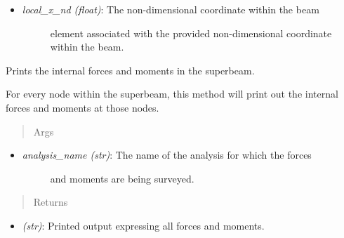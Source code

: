 \documentclass[letterpaper,10pt,english]{sphinxmanual}
\begin{document}
\begin{fulllineitems}
\begin{fulllineitems}
\begin{itemize}
\begin{description}
\end{description}

\item {} \begin{description}
\item[{\emph{local\_x\_nd (float)}: The non-dimensional coordinate within the beam}] \leavevmode
element associated with the provided non-dimensional coordinate
within the beam.

\end{description}

\end{itemize}

\end{fulllineitems}


\begin{fulllineitems}
\label{structures:AeroComBAT.Structures.SuperBeam.printInternalForce}
Prints the internal forces and moments in the superbeam.

For every node within the superbeam, this method will print out the
internal forces and moments at those nodes.
\begin{quote}\begin{description}
\item[{Args}] \leavevmode
\end{description}\end{quote}
\begin{itemize}
\item {} \begin{description}
\item[{\emph{analysis\_name (str)}: The name of the analysis for which the forces}] \leavevmode
and moments are being surveyed.

\end{description}

\end{itemize}
\begin{quote}\begin{description}
\item[{Returns}] \leavevmode
\end{description}\end{quote}
\begin{itemize}
\item {} 
\emph{(str)}: Printed output expressing all forces and moments.


\end{itemize}
\end{fulllineitems}
\end{fulllineitems}
\end{document}
